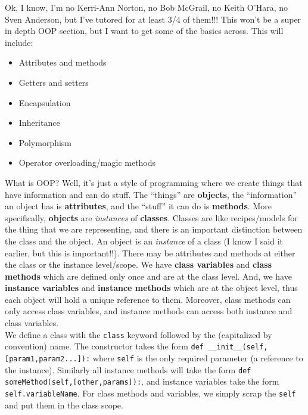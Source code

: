 \documentclass[12pt]{article}
\begin{document}
Ok, I know, I'm no Kerri-Ann Norton, no Bob McGrail, no Keith O'Hara, no Sven Anderson, but I've tutored for at least 3/4 of them!!! This won't be a super in depth OOP section, but I want to get some of the basics across. This will include:
\begin{itemize} \item Attributes and methods\end{itemize}
\begin{itemize} \item Getters and setters\end{itemize}
\begin{itemize} \item Encapsulation\end{itemize}
\begin{itemize} \item Inheritance\end{itemize}
\begin{itemize} \item Polymorphism\end{itemize}
\begin{itemize} \item Operator overloading/magic methods\end{itemize}
What is OOP? Well, it's just a style of programming where we create things that have information and can do stuff. The ``things'' are \textbf{objects}, the ``information'' an object has is \textbf{attributes}, and the ``stuff'' it can do is \textbf{methods}. More specifically, \textbf{objects} are \textit{instances} of \textbf{classes}. Classes are like recipes/models for the thing that we are representing, and there is an important distinction between the class and the object. An object is an \textit{instance} of a class (I know I said it earlier, but this is important!!). There may be attributes and methods at either the class or the instance level/scope. We have \textbf{class variables} and \textbf{class methods} which are defined only once and are at the class level. And, we have \textbf{instance variables} and \textbf{instance methods} which are at the object level, thus each object will hold a unique reference to them. Moreover, class methods can only access class variables, and instance methods can access both instance and class variables.\\
We define a class with the \texttt{class} keyword followed by the (capitalized by convention) name. The constructor takes the form \texttt{def \_\_init\_\_(self,[param1,param2...]):} where \texttt{self} is the only required parameter (a reference to the instance). Similarly all instance methods will take the form \texttt{def someMethod(self,[other,params]):}, and instance variables take the form \texttt{self.variableName}. For class methods and variables, we simply scrap the \texttt{self} and put them in the class scope.\\
\end{document}
